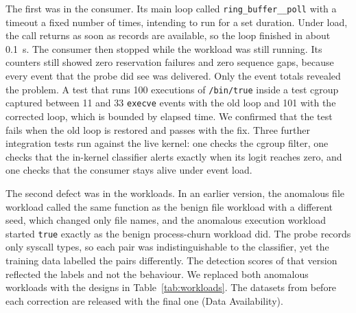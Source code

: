 The first was in the consumer. Its main loop called \texttt{ring\_buffer\_\_poll} with a timeout a fixed number of times, intending to run for a set duration. Under load, the call returns as soon as records are available, so the loop finished in about 0.1~s. The consumer then stopped while the workload was still running. Its counters still showed zero reservation failures and zero sequence gaps, because every event that the probe did see was delivered. Only the event totals revealed the problem. A test that runs 100 executions of \texttt{/bin/true} inside a test cgroup captured between 11 and 33 \texttt{execve} events with the old loop and 101 with the corrected loop, which is bounded by elapsed time. We confirmed that the test fails when the old loop is restored and passes with the fix. Three further integration tests run against the live kernel: one checks the cgroup filter, one checks that the in-kernel classifier alerts exactly when its logit reaches zero, and one checks that the consumer stays alive under event load.

The second defect was in the workloads. In an earlier version, the anomalous file workload called the same function as the benign file workload with a different seed, which changed only file names, and the anomalous execution workload started \texttt{true} exactly as the benign process-churn workload did. The probe records only syscall types, so each pair was indistinguishable to the classifier, yet the training data labelled the pairs differently. The detection scores of that version reflected the labels and not the behaviour. We replaced both anomalous workloads with the designs in Table~\ref{tab:workloads}. The datasets from before each correction are released with the final one (Data Availability).
